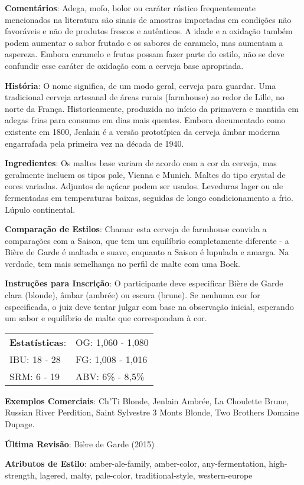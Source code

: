 \textbf{Comentários}: Adega, mofo, bolor ou caráter rústico frequentemente mencionados na literatura são sinais de amostras importadas em condições não favoráveis e não de produtos frescos e autênticos. A idade e a oxidação também podem aumentar o sabor frutado e os sabores de caramelo, mas aumentam a aspereza. Embora caramelo e frutas possam fazer parte do estilo, não se deve confundir esse caráter de oxidação com a cerveja base apropriada.

\textbf{História}: O nome significa, de um modo geral, cerveja para guardar. Uma tradicional cerveja artesanal de áreas rurais (farmhouse) ao redor de Lille, no norte da França. Historicamente, produzida no início da primavera e mantida em adegas frias para consumo em dias mais quentes. Embora documentado como existente em 1800, Jenlain é a versão prototípica da cerveja âmbar moderna engarrafada pela primeira vez na década de 1940.

\textbf{Ingredientes}: Os maltes base variam de acordo com a cor da cerveja, mas geralmente incluem os tipos pale, Vienna e Munich. Maltes do tipo crystal de cores variadas. Adjuntos de açúcar podem ser usados. Leveduras lager ou ale fermentadas em temperaturas baixas, seguidas de longo condicionamento a frio. Lúpulo continental.

\textbf{Comparação de Estilos}: Chamar esta cerveja de farmhouse convida a comparações com a Saison, que tem um equilíbrio completamente diferente - a Bière de Garde é maltada e suave, enquanto a Saison é lupulada e amarga. Na verdade, tem mais semelhança no perfil de malte com uma Bock.

\textbf{Instruções para Inscrição}: O participante deve especificar Bière de Garde clara (blonde), âmbar (ambrée) ou escura (brune). Se nenhuma cor for especificada, o juiz deve tentar julgar com base na observação inicial, esperando um sabor e equilíbrio de malte que correspondam à cor.

\begin{tabular}{@{}p{35mm}p{35mm}@{}}
  \textbf{Estatísticas}: & OG: 1,060 - 1,080 \\
  IBU: 18 - 28  & FG: 1,008 - 1,016  \\
  SRM: 6 - 19  & ABV: 6\% - 8,5\%
\end{tabular}

\textbf{Exemplos Comerciais}: Ch’Ti Blonde, Jenlain Ambrée, La Choulette Brune, Russian River Perdition, Saint Sylvestre 3 Monts Blonde, Two Brothers Domaine Dupage.

\textbf{Última Revisão}: Bière de Garde (2015)

\textbf{Atributos de Estilo}: amber-ale-family, amber-color, any-fermentation, high-strength, lagered, malty, pale-color, traditional-style, western-europe
